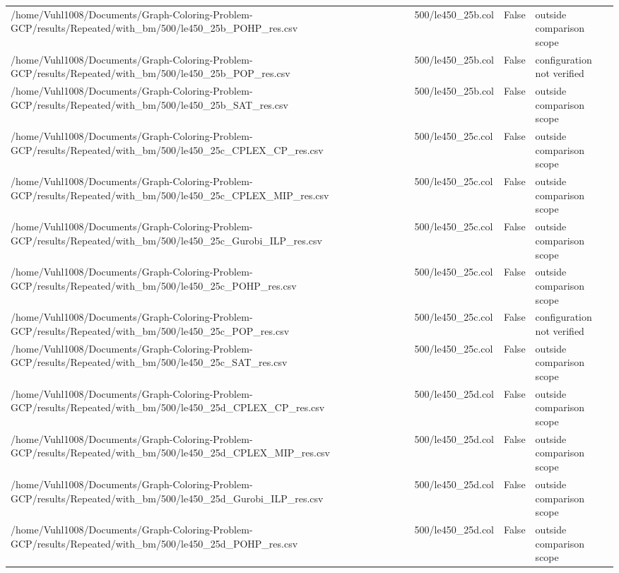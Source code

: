 \begin{table}[htbp]
\begin{tabular}{llll}
/home/Vuhl1008/Documents/Graph-Coloring-Problem-GCP/results/Repeated/with\_bm/500/le450\_25b\_POHP\_res.csv & 500/le450\_25b.col & False & outside comparison scope \\
/home/Vuhl1008/Documents/Graph-Coloring-Problem-GCP/results/Repeated/with\_bm/500/le450\_25b\_POP\_res.csv & 500/le450\_25b.col & False & configuration not verified \\
/home/Vuhl1008/Documents/Graph-Coloring-Problem-GCP/results/Repeated/with\_bm/500/le450\_25b\_SAT\_res.csv & 500/le450\_25b.col & False & outside comparison scope \\
/home/Vuhl1008/Documents/Graph-Coloring-Problem-GCP/results/Repeated/with\_bm/500/le450\_25c\_CPLEX\_CP\_res.csv & 500/le450\_25c.col & False & outside comparison scope \\
/home/Vuhl1008/Documents/Graph-Coloring-Problem-GCP/results/Repeated/with\_bm/500/le450\_25c\_CPLEX\_MIP\_res.csv & 500/le450\_25c.col & False & outside comparison scope \\
/home/Vuhl1008/Documents/Graph-Coloring-Problem-GCP/results/Repeated/with\_bm/500/le450\_25c\_Gurobi\_ILP\_res.csv & 500/le450\_25c.col & False & outside comparison scope \\
/home/Vuhl1008/Documents/Graph-Coloring-Problem-GCP/results/Repeated/with\_bm/500/le450\_25c\_POHP\_res.csv & 500/le450\_25c.col & False & outside comparison scope \\
/home/Vuhl1008/Documents/Graph-Coloring-Problem-GCP/results/Repeated/with\_bm/500/le450\_25c\_POP\_res.csv & 500/le450\_25c.col & False & configuration not verified \\
/home/Vuhl1008/Documents/Graph-Coloring-Problem-GCP/results/Repeated/with\_bm/500/le450\_25c\_SAT\_res.csv & 500/le450\_25c.col & False & outside comparison scope \\
/home/Vuhl1008/Documents/Graph-Coloring-Problem-GCP/results/Repeated/with\_bm/500/le450\_25d\_CPLEX\_CP\_res.csv & 500/le450\_25d.col & False & outside comparison scope \\
/home/Vuhl1008/Documents/Graph-Coloring-Problem-GCP/results/Repeated/with\_bm/500/le450\_25d\_CPLEX\_MIP\_res.csv & 500/le450\_25d.col & False & outside comparison scope \\
/home/Vuhl1008/Documents/Graph-Coloring-Problem-GCP/results/Repeated/with\_bm/500/le450\_25d\_Gurobi\_ILP\_res.csv & 500/le450\_25d.col & False & outside comparison scope \\
/home/Vuhl1008/Documents/Graph-Coloring-Problem-GCP/results/Repeated/with\_bm/500/le450\_25d\_POHP\_res.csv & 500/le450\_25d.col & False & outside comparison scope \\

\end{tabular}
\end{table}
